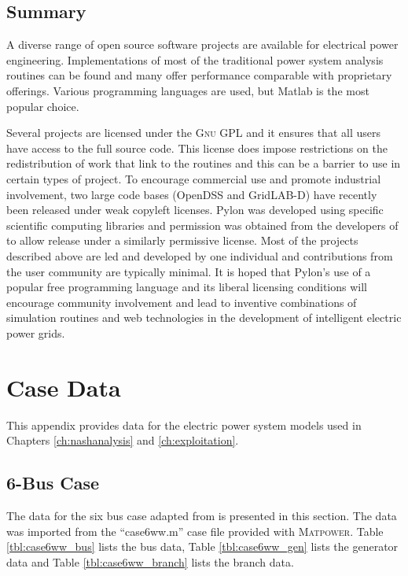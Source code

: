\section*{Summary} A diverse range of open source software projects are
available for electrical power engineering. Implementations of most of the
traditional power system analysis routines can be found and many offer
performance comparable with proprietary offerings.  Various programming
languages are used, but Matlab is the most popular choice.

Several projects are licensed under the \textsc{Gnu} GPL and it ensures that all
users have access to the full source code.  This license does impose
restrictions on the redistribution of work that link to the routines and this
can be a barrier to use in certain types of project.  To encourage commercial
use and promote industrial involvement, two large code bases (OpenDSS and
GridLAB-D) have recently been released under weak copyleft licenses.  Pylon was
developed using specific scientific computing libraries and permission was
obtained from the developers of \matpower to allow release under a similarly
permissive license. Most of the projects described above are led and developed
by one individual and contributions from the user community are typically
minimal.  It is hoped that Pylon's use of a popular free programming language
and its liberal licensing conditions will encourage community involvement and
lead to inventive combinations of simulation routines and web technologies in
the development of intelligent electric power grids.

\chapter{Case Data}
This appendix provides data for the electric power system models used in
Chapters \ref{ch:nashanalysis} and \ref{ch:exploitation}.

\section{6-Bus Case}
\label{adx:case6ww}
The data for the six bus case adapted from  is presented in this section.  The data was imported from the
``case6ww.m'' case file provided with \textsc{Matpower}.
Table \ref{tbl:case6ww_bus} lists the bus data, Table \ref{tbl:case6ww_gen}
lists the generator data and Table \ref{tbl:case6ww_branch} lists the branch
data.

